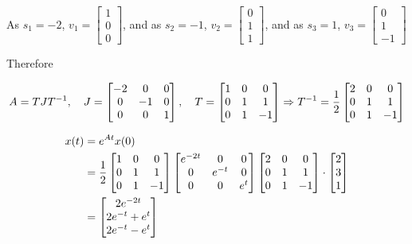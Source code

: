 \documentclass[12pt,a4paper]{article}
\begin{document}
As $s_1 = -2$, $v_1 = \begin{bmatrix}
	1 \\ 0 \\ 0
\end{bmatrix}$, and as $s_2 = -1$, $v_2 = \begin{bmatrix}
0 \\ 1\\ 1
\end{bmatrix}$, and as $s_3 = 1 $, $v_3 = \begin{bmatrix}
0 \\ 1 \\ -1
\end{bmatrix}$

Therefore

\[
A = TJT^{-1} ,\quad J = \begin{bmatrix}
	-2 & 0 & 0 \\
	0 & -1 & 0 \\ 
	0 & 0 & 1 
\end{bmatrix},\quad T = \begin{bmatrix}
 	1 & 0 & 0 \\
 	0 & 1 & 1 \\
 	0 & 1 & -1
\end{bmatrix} \Rightarrow T^{-1} = {1\over2}\begin{bmatrix}
2 & 0 & 0 \\
0 & 1 & 1 \\
0 & 1 & -1
\end{bmatrix}
\]

\begin{align*}
	x(t) &= e^{At}x(0) \\
	&=  {1\over2}\begin{bmatrix}
		1 & 0 & 0 \\
		0 & 1 & 1 \\
		0 & 1 & -1
	\end{bmatrix}\begin{bmatrix}
	e^{-2t} & 0 & 0 \\
	0 & e^{-t} & 0  \\
	0 & 0 & e^{t}
	\end{bmatrix}\begin{bmatrix}
	2 & 0 & 0 \\
	0 & 1 & 1 \\
	0 & 1 & -1
	\end{bmatrix} \cdot \begin{bmatrix}
	2 \\ 3 \\ 1
	\end{bmatrix} \\
	&= \begin{bmatrix}
		2e^{-2t} \\
		2e^{-t} + e^{t} \\
		2e^{-t}- e^t
	\end{bmatrix}
\end{align*}
\end{document}
